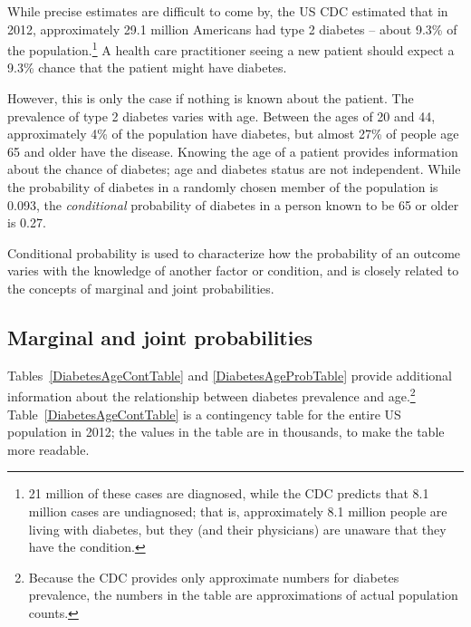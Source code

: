 While precise estimates are difficult to come by, the US CDC estimated that in 2012, approximately 29.1 million Americans had type 2 diabetes -- about 9.3\% of the population.\footnote{21 million of these cases are diagnosed, while the CDC predicts that 8.1 million cases are undiagnosed; that is, approximately 8.1 million people are living with diabetes, but they (and their physicians) are unaware that they have the condition.} A health care practitioner seeing a new patient should expect a 9.3\% chance that the patient might have diabetes. 

However, this is only the case if nothing is known about the patient. The prevalence of type 2 diabetes varies with age. Between the ages of 20 and 44, approximately 4\% of the population have diabetes, but almost 27\% of people age 65 and older have the disease. Knowing the age of a patient provides information about the chance of diabetes; age and diabetes status are not independent. While the probability of diabetes in a randomly chosen member of the population is 0.093, the \textit{conditional} probability of diabetes in a person known to be 65 or older is 0.27.

Conditional probability is used to  characterize how the probability of an outcome varies with the knowledge of another factor or condition, and is closely related to the concepts of marginal and joint probabilities.

\subsection{Marginal and joint probabilities}
\label{marginalAndJointProbabilities}



Tables~\ref{DiabetesAgeContTable} and \ref{DiabetesAgeProbTable} provide additional information about the relationship between diabetes prevalence and age.\footnote{Because the CDC provides only approximate numbers for diabetes prevalence, the numbers in the table are approximations of actual population counts.} Table~\ref{DiabetesAgeContTable} is a contingency table for the entire US population in 2012; the values in the table are in thousands, to make the table more readable.  

